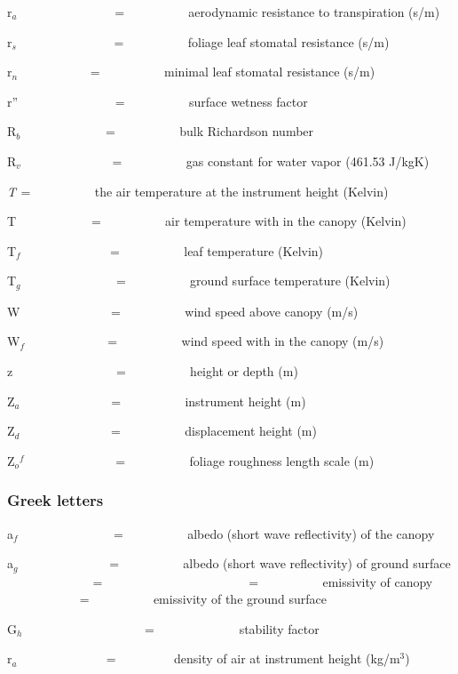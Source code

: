 r\(_{a}\)~~~~~~~~~~~~~~~ = ~~~~~~~~~ aerodynamic resistance to transpiration (s/m)

r\(_{s}\)~~~~~~~~~~~~~~~ = ~~~~~~~~~ foliage leaf stomatal resistance (s/m)

r\(_{n}\)~~~~~~~~~~~ = ~~~~~~~~~ minimal leaf stomatal resistance (s/m)

r''~~~~~~~~~~~~~~~ = ~~~~~~~~~ surface wetness factor

R\(_{b}\)~~~~~~~~~~~~~ = ~~~~~~~~~ bulk Richardson number

R\(_{v}\)~~~~~~~~~~~~~~ = ~~~~~~~~~ gas constant for water vapor (461.53 J/kgK)

\emph{T\(_{ }\)} = ~~~~~~~~~ the air temperature at the instrument height (Kelvin)

T\(_{ }\) ~ ~~~~~~~~~ = ~~~~~~~~~ air temperature with in the canopy (Kelvin)

T\emph{\(_{f}\)}~~ ~~~~~~~~~~~ = ~~~~~~~~~ leaf temperature (Kelvin)

T\(_{g}\) ~~~~~~~~~~~~~~ = ~~~~~~~~~ ground surface temperature (Kelvin)

W~~~~~~~~~~~~~~ = ~~~~~~~~~ wind speed above canopy (m/s)

W\(_{f}\)~ ~~~~~~~~~~~ = ~~~~~~~~~ wind speed with in the canopy (m/s)

z~~~~~~~~~~~~~~~~ = ~~~~~~~~~ height or depth (m)

Z\(_{a}\)~~~~~~~~~~~~~~ = ~~~~~~~~~ instrument height (m)

Z\(_{d}\)~~~~~~~~~~~~~~ = ~~~~~~~~~ displacement height (m)

Z\(_{o}\)\(^{f}\)~~~~~~~~~~~~~~ = ~~~~~~~~~ foliage roughness length scale (m)

\subsubsection{Greek letters}\label{greek-letters-000}

a\(_{f}\)~~~ ~~~~~~~~~~~ = ~~~~~~~~~ albedo (short wave reflectivity) of the canopy

a\(_{g}\)~~~~~~~~~~~~~~ = ~~~~~~~~~ albedo (short wave reflectivity) of ground surface \(_{}\)~~~~~~~~~~~~~ = ~~~~~~~~~ \(_{}\) \(_{ }\) ~~~~~~~~~~~ = ~~~~~~~~~ emissivity of canopy \(_{ }\) ~~~~~~~~~~~ = ~~~~~~~~~ emissivity of the ground surface

G\(_{h}\)~~~~~~~~~~~~~~~~~~~ = ~~~~~~~~~~~~~stability factor

r\(_{a}\)~ ~~~~~~~~~~~~ = ~~~~~~~~ density of air at instrument height (kg/m\(^{3}\))

